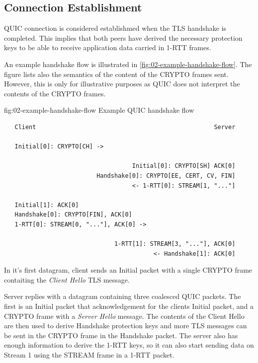 \subsection{Connection Establishment}

QUIC connection is considered establishmed when the TLS handshake is completed. This implies that
both peers have derived the necessary protection keys to be able to receive application data carried
in 1-RTT frames.

An example handshake flow is illustrated in
\autoref{fig:02-example-handshake-flow}. The figure lists also the semantics of the content of the
CRYPTO frames sent. However, this is only for illustrative purposes as QUIC does not interpret the
contents of the CRYPTO frames.

\begin{myFigure}
  {fig:02-example-handshake-flow}
  {Example QUIC handshake flow}

  \begin{verbatim}
   Client                                                  Server

   Initial[0]: CRYPTO[CH] ->

                                    Initial[0]: CRYPTO[SH] ACK[0]
                          Handshake[0]: CRYPTO[EE, CERT, CV, FIN]
                                    <- 1-RTT[0]: STREAM[1, "..."]

   Initial[1]: ACK[0]
   Handshake[0]: CRYPTO[FIN], ACK[0]
   1-RTT[0]: STREAM[0, "..."], ACK[0] ->

                               1-RTT[1]: STREAM[3, "..."], ACK[0]
                                          <- Handshake[1]: ACK[0]
  \end{verbatim}

\end{myFigure}

In it's first datagram, client sends an Initial packet with a single CRYPTO frame contaiting the
\textit{Client Hello} TLS message.

Server replies with a datagram containing three coalesced QUIC packets. The first is an Initial
packet that acknowledgement for the clients Initial packet, and a CRYPTO frame with a \textit{Server
  Hello} message. The contents of the Client Hello are then used to derive Handshake protection keys
and more TLS messages can be sent in the CRYPTO frame in the Handshake packet. The server also has
enough information to derive the 1-RTT keys, so it can also start sending data on Stream 1 using the
STREAM frame in a 1-RTT packet.

